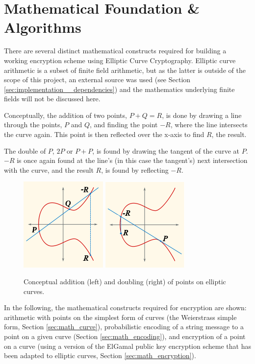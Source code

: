 \section{Mathematical Foundation \& Algorithms}

There are several distinct mathematical constructs required for building a working encryption scheme using Elliptic
Curve Cryptography. Elliptic curve arithmetic is a subset of finite field arithmetic, but as the latter is outside
of the scope of this project, an external source was used (see Section \ref{sec:implementation__dependencies}) and
the mathematics underlying finite fields will not be discussed here.

Conceptually, the addition of two points, \(P + Q = R\), is done by drawing a line through the points, \(P\) and \(Q\),
and finding the point \(-R\), where the line intersects the curve again. This point is
then reflected over the x-axis to find \(R\), the result.

The double of \(P\), \(2P\) or \(P+P\), is found by drawing the tangent of the curve at \(P\).
\(-R\) is once again found at the line's (in this case the tangent's) next intersection
with the curve, and the result \(R\), is found by reflecting \(-R\).\cite{hankerson2010}

\begin{figure}[htb]
	\centering
	\includegraphics{maths/addition}
	\includegraphics{maths/doubling}
	\caption{Conceptual addition (left) and doubling (right) of points on elliptic curves.}
\end{figure}

In the following, the mathematical constructs required for encryption are shown: arithmetic with points on the simplest
form of curves (the Weierstrass simple form, Section \ref{sec:math_curve}), probabilistic encoding of a string message
to a point on a given curve (Section \ref{sec:math_encoding}), and encryption of a point on a curve (using a version
of the ElGamal public key encryption scheme that has been adapted to elliptic curves, Section \ref{sec:math_encryption}).



